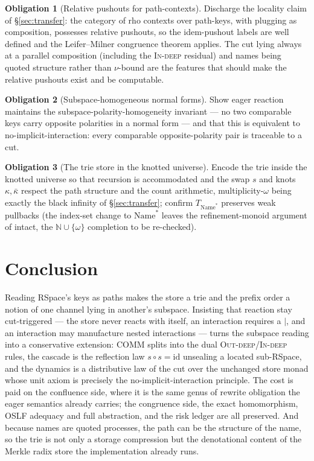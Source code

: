 \documentclass[11pt]{article}
\theoremstyle{plain}
\theoremstyle{definition}
\newtheorem{obligation}{Obligation}
\newcommand{\Name}{\mathrm{Name}}
\begin{document}
\begin{obligation}[Relative pushouts for path-contexts]
Discharge the locality claim of \S\ref{sec:transfer}: the category of rho contexts over path-keys,
with plugging as composition, possesses relative pushouts, so the idem-pushout labels are well defined
and the Leifer--Milner congruence theorem applies. The cut lying always at a parallel composition
(including the \textsc{In-deep} residual) and names being quoted structure rather than $\nu$-bound are
the features that should make the relative pushouts exist and be computable.
\end{obligation}

\begin{obligation}[Subspace-homogeneous normal forms]
Show eager reaction maintains the subspace-polarity-homogeneity invariant --- no two comparable keys
carry opposite polarities in a normal form --- and that this is equivalent to no-implicit-interaction:
every comparable opposite-polarity pair is traceable to a cut.
\end{obligation}

\begin{obligation}[The trie store in the knotted universe]
Encode the trie inside the knotted universe so that recursion is accommodated and the swap $s$ and
knots $\kappa,\bar\kappa$ respect the path structure and the count arithmetic, multiplicity-$\omega$
being exactly the black infinity of \S\ref{sec:transfer}; confirm $T_{\Name^{\ast}}$ preserves weak
pullbacks (the index-set change to $\Name^{\ast}$ leaves the refinement-monoid argument of
\cite{GS01} intact, the $\mathbb N\cup\{\omega\}$ completion to be re-checked).
\end{obligation}

\section{Conclusion}

Reading RSpace's keys as paths makes the store a trie and the prefix order a notion of one channel
lying in another's subspace. Insisting that reaction stay cut-triggered --- the store never reacts
with itself, an interaction requires a $\mid$, and an interaction may manufacture nested interactions
--- turns the subspace reading into a conservative extension: COMM splits into the dual
\textsc{Out-deep}/\textsc{In-deep} rules, the cascade is the reflection law $s\circ s=\mathrm{id}$
unsealing a located sub-RSpace, and the dynamics is a distributive law of the cut over the unchanged
store monad whose unit axiom is precisely the no-implicit-interaction principle. The cost is paid on
the confluence side, where it is the same genus of rewrite obligation the eager semantics already
carries; the congruence side, the exact homomorphism, OSLF adequacy and full abstraction, and the
risk ledger are all preserved. And because names are quoted processes, the path can be the structure
of the name, so the trie is not only a storage compression but the denotational content of the Merkle
radix store the implementation already runs.
\end{document}
